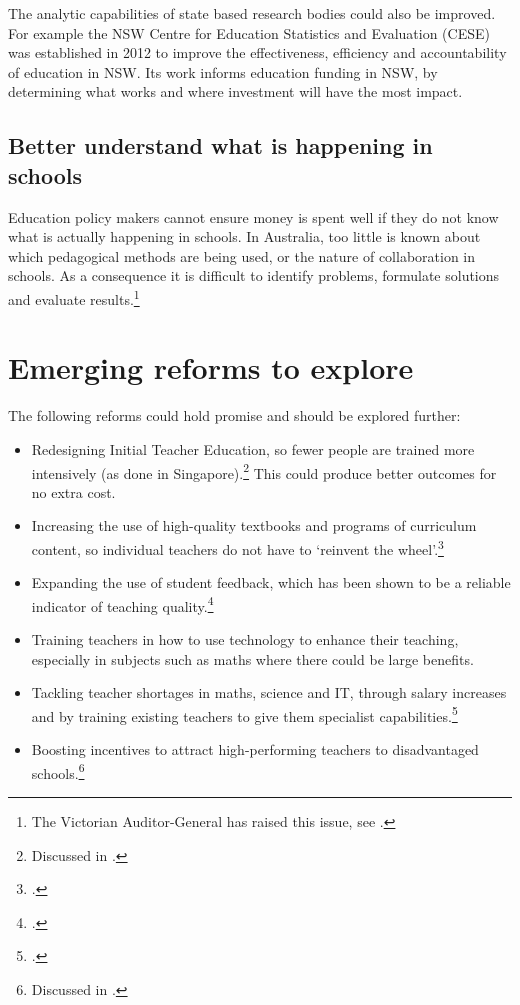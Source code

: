 The analytic capabilities of state based research bodies could also be improved. For example the NSW Centre for Education Statistics and Evaluation (CESE) was established in 2012 to improve the effectiveness, efficiency and accountability of education in NSW\@. Its work informs education funding in NSW, by determining what works and where investment will have the most impact. 

\subsection{Better understand what is happening in schools}\label{subsec:practices}

Education policy makers cannot ensure money is spent well if they do not know what is actually happening in schools. In Australia, too little is known about which pedagogical methods are being used, or the nature of collaboration in schools. As a consequence it is difficult to identify problems, formulate solutions and evaluate results.\footnote{The Victorian Auditor-General has raised this issue, see \textcite{2010Auditor-General}.}   

\section{Emerging reforms to explore}\label{sec:emerging}

The following reforms could hold promise and should be explored further:

\begin{itemize}
    \item Redesigning Initial Teacher Education, so fewer people are trained more intensively (as done in Singapore).\footnote{Discussed in \textcite{Jensen2012CatchingUpLearning}.} This could produce better outcomes for no extra cost. 
    \item Increasing the use of high-quality textbooks and programs of curriculum content, so individual teachers do not have to `reinvent the wheel'.\footcite{Koedel2017Bigbangforjustafewbucks} 
    \item Expanding the use of student feedback, which has been shown to be a reliable indicator of teaching quality.\footcite{MET2012AskingStudentsAboutTeaching}
    \item Training teachers in how to use technology to enhance their teaching, especially in subjects such as maths where there could be large benefits.
    \item Tackling teacher shortages in maths, science and IT, through salary increases and by training existing teachers to give them specialist capabilities.\footcite{ProductivityCommission2017Shiftingthedial}
    \item Boosting incentives to attract high-performing teachers to disadvantaged schools.\footnote{Discussed in \textcite{Riceetal2017Howtogetqualityteachersindisadvantagedschools}.}
    
\end{itemize}


